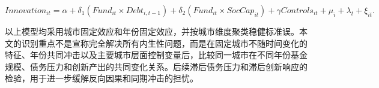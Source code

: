 \begin{equation}
Innovation_{it}=\alpha+\delta_1(Fund_{it}\times Debt_{i,t-1})
+\delta_2(Fund_{it}\times SocCap_{it})+\gamma Controls_{it}+\mu_i+\lambda_t+\xi_{it}.
\end{equation}

以上模型均采用城市固定效应和年份固定效应，并按城市维度聚类稳健标准误。本文的识别重点不是宣称完全解决所有内生性问题，而是在固定城市不随时间变化的特征、年份共同冲击以及主要城市层面控制变量后，比较同一城市在不同年份基金规模、债务压力和创新产出的共同变化关系。后续滞后债务压力和滞后创新响应的检验，用于进一步缓解反向因果和同期冲击的担忧。
